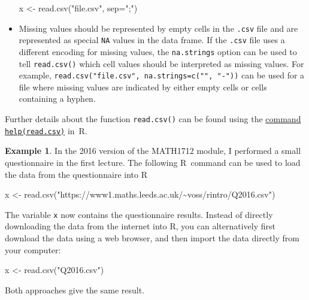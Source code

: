 \documentclass[
  a4paper,
]{article}
\newenvironment{Shaded}{\begin{snugshade}}{\end{snugshade}}
\newcommand{\AttributeTok}[1]{\textcolor[rgb]{0.77,0.63,0.00}{#1}}
\newcommand{\FunctionTok}[1]{\textcolor[rgb]{0.00,0.00,0.00}{#1}}
\newcommand{\NormalTok}[1]{#1}
\newcommand{\OtherTok}[1]{\textcolor[rgb]{0.56,0.35,0.01}{#1}}
\newcommand{\StringTok}[1]{\textcolor[rgb]{0.31,0.60,0.02}{#1}}
\theoremstyle{definition}
\theoremstyle{definition}
\newtheorem{example}{Example}[section]
\theoremstyle{definition}
\theoremstyle{definition}
\theoremstyle{remark}
\begin{document}
\begin{itemize}
\begin{Shaded}
\begin{Highlighting}[]
\NormalTok{  x }\OtherTok{\textless{}{-}} \FunctionTok{read.csv}\NormalTok{(}\StringTok{"file.csv"}\NormalTok{, }\AttributeTok{sep=}\StringTok{";"}\NormalTok{)}
\end{Highlighting}
\end{Shaded}
\item
  Missing values should be represented by empty cells in the \texttt{.csv}
  file and are represented as special \texttt{NA} values in the data frame.
  If the \texttt{.csv} file uses a different encoding for missing values,
  the \texttt{na.strings} option can be used to tell \texttt{read.csv()}
  which cell values should be interpreted as missing values. For example,
  \texttt{read.csv("file.csv",\ na.strings=c("",\ "-"))} can be used for a file
  where missing values are indicated by either empty cells or cells
  containing a hyphen.
\end{itemize}

Further details about the function \texttt{read.csv()} can be found using the
\href{https://rdrr.io/r/utils/read.table.html}{command \texttt{help(read.csv)}} in~R.

\begin{example}
\protect\hypertarget{exm:l1-poll-import}{}\label{exm:l1-poll-import}In the 2016 version of the MATH1712 module, I performed a small questionnaire
in the first lecture. The following R~command can be used to load the data
from the questionnaire into R

\begin{Shaded}
\begin{Highlighting}[]
\NormalTok{  x }\OtherTok{\textless{}{-}} \FunctionTok{read.csv}\NormalTok{(}\StringTok{"https://www1.maths.leeds.ac.uk/\textasciitilde{}voss/rintro/Q2016.csv"}\NormalTok{)}
\end{Highlighting}
\end{Shaded}

The variable \texttt{x} now contains the questionnaire results.
Instead of
directly downloading the data from the internet into R, you can
alternatively first download the data using a web browser, and then
import the data directly from your computer:

\begin{Shaded}
\begin{Highlighting}[]
\NormalTok{  x }\OtherTok{\textless{}{-}} \FunctionTok{read.csv}\NormalTok{(}\StringTok{"Q2016.csv"}\NormalTok{)}
\end{Highlighting}
\end{Shaded}

Both approaches give the same result.
\end{example}
\end{document}
